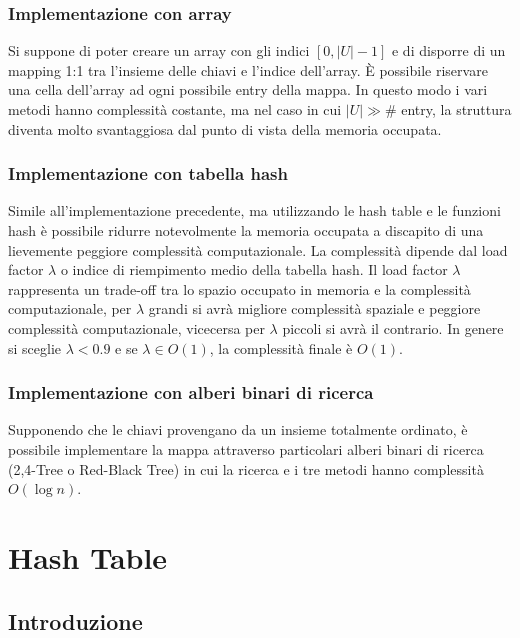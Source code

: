 \documentclass[a4paper]{article}
\begin{document}
\subsubsection*{Implementazione con array}
Si suppone di poter creare un array con gli indici \([0, |U|-1]\) e di disporre di un mapping 1:1 tra l'insieme delle chiavi
e l'indice dell'array. È possibile riservare una cella dell'array ad ogni possibile entry della mappa. In questo modo i vari
metodi hanno complessità costante, ma nel caso in cui \(|U| \gg \#\) entry, la struttura diventa molto svantaggiosa dal punto
di vista della memoria occupata.

\subsubsection*{Implementazione con tabella hash}
Simile all'implementazione precedente, ma utilizzando le hash table e le funzioni hash è possibile ridurre notevolmente la memoria
occupata a discapito di una lievemente peggiore complessità computazionale. La complessità dipende dal load factor \(\lambda\)
o indice di riempimento medio della tabella hash. Il load factor \(\lambda\) rappresenta un trade-off tra lo spazio occupato in
memoria e la complessità computazionale, per \(\lambda\) grandi si avrà migliore complessità spaziale e peggiore complessità
computazionale, vicecersa per \(\lambda\) piccoli si avrà il contrario. In genere si sceglie \(\lambda < 0.9\) e se
\(\lambda \in O(1)\), la complessità finale è \(O(1)\). 

\subsubsection*{Implementazione con alberi binari di ricerca}
Supponendo che le chiavi provengano da un insieme totalmente ordinato, è possibile implementare la mappa attraverso particolari
alberi binari di ricerca (2,4-Tree o Red-Black Tree) in cui la ricerca e i tre metodi hanno complessità \(O(\log n)\).

\newpage

\section{Hash Table}
\subsection{Introduzione}
\end{document}
